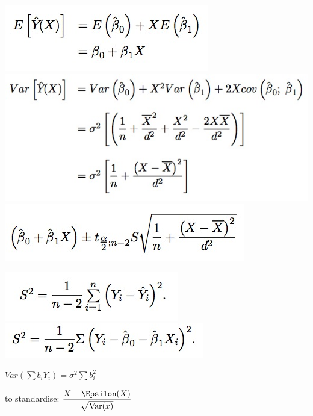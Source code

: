 \documentclass{examnotes}
\begin{document}
\includegraphics[scale=0.5]{./img/851.jpg}
\includegraphics[scale=0.5]{./img/852.jpg}
\includegraphics[scale=0.5]{./img/853.jpg}

\includegraphics[scale=0.5]{./img/s21.jpg}
\includegraphics[scale=0.5]{./img/s22.jpg}


$Var(\sum{b_iY_i})=\sigma^2\sum{b^2_i}$

to standardise: $\displaystyle\frac{X-\Epsilon(X)}{\sqrt{\mathrm{Var}(x)}}$
\end{document}
